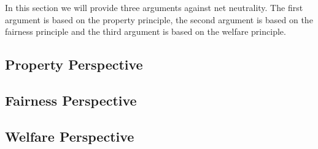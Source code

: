 
In this section we will provide three arguments against net neutrality. The first argument is based on the property principle, the second argument is based on the fairness principle and the third argument is based on the welfare principle.

\subsection{Property Perspective}
\label{sec:arguments_property}


\subsection{Fairness Perspective}
\label{sec:arguments_fairness}


\subsection{Welfare Perspective}
\label{sec:arguments_welfare}

